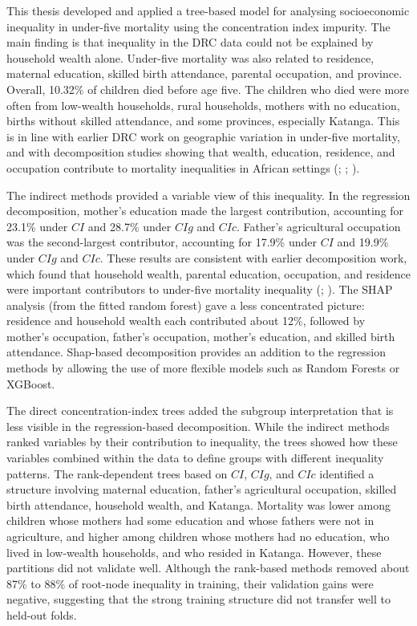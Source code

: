 \documentclass[
  11pt,
  a4paper,
]{article}
\begin{document}
This thesis developed and applied a tree-based model for analysing
socioeconomic inequality in under-five mortality using the concentration
index impurity. The main finding is that inequality in the DRC data
could not be explained by household wealth alone. Under-five mortality
was also related to residence, maternal education, skilled birth
attendance, parental occupation, and province. Overall, 10.32\% of
children died before age five. The children who died were more often
from low-wealth households, rural households, mothers with no education,
births without skilled attendance, and some provinces, especially
Katanga. This is in line with earlier DRC work on geographic variation
in under-five mortality, and with decomposition studies showing that
wealth, education, residence, and occupation contribute to mortality
inequalities in African settings
(; ; ).

The indirect methods provided a variable view of this inequality. In the
regression decomposition, mother's education made the largest
contribution, accounting for 23.1\% under \(CI\) and 28.7\% under
\(CIg\) and \(CIc\). Father's agricultural occupation was the
second-largest contributor, accounting for 17.9\% under \(CI\) and
19.9\% under \(CIg\) and \(CIc\). These results are consistent with
earlier decomposition work, which found that household wealth, parental
education, occupation, and residence were important contributors to
under-five mortality inequality
(; ). The SHAP analysis (from the fitted
random forest) gave a less concentrated picture: residence and household
wealth each contributed about 12\%, followed by mother's occupation,
father's occupation, mother's education, and skilled birth attendance.
Shap-based decomposition provides an addition to the regression methods
by allowing the use of more flexible models such as Random Forests or
XGBoost.

The direct concentration-index trees added the subgroup interpretation
that is less visible in the regression-based decomposition. While the
indirect methods ranked variables by their contribution to inequality,
the trees showed how these variables combined within the data to define
groups with different inequality patterns. The rank-dependent trees
based on \(CI\), \(CIg\), and \(CIc\) identified a structure involving
maternal education, father's agricultural occupation, skilled birth
attendance, household wealth, and Katanga. Mortality was lower among
children whose mothers had some education and whose fathers were not in
agriculture, and higher among children whose mothers had no education,
who lived in low-wealth households, and who resided in Katanga. However,
these partitions did not validate well. Although the rank-based methods
removed about 87\% to 88\% of root-node inequality in training, their
validation gains were negative, suggesting that the strong training
structure did not transfer well to held-out folds.
\end{document}
